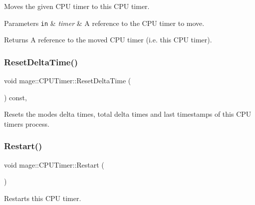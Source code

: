 Moves the given C\+PU timer to this C\+PU timer.


\begin{DoxyParams}[1]{Parameters}
\mbox{\tt in}  & {\em timer} & A reference to the C\+PU timer to move. \\
\hline
\end{DoxyParams}
\begin{DoxyReturn}{Returns}
A reference to the moved C\+PU timer (i.\+e. this C\+PU timer). 
\end{DoxyReturn}
\hypertarget{classmage_1_1_c_p_u_timer_acb1a264ae09cea3d96794e3c0af246e7}{}\label{classmage_1_1_c_p_u_timer_acb1a264ae09cea3d96794e3c0af246e7} 
\subsubsection{\texorpdfstring{Reset\+Delta\+Time()}{ResetDeltaTime()}}
{\footnotesize\ttfamily void mage\+::\+C\+P\+U\+Timer\+::\+Reset\+Delta\+Time (\begin{DoxyParamCaption}{ }\end{DoxyParamCaption}) const\hspace{0.3cm}{\ttfamily [private]}, {\ttfamily [noexcept]}}

Resets the modes\textquotesingle{} delta times, total delta times and last timestamps of this C\+PU timer\textquotesingle{}s process. \hypertarget{classmage_1_1_c_p_u_timer_aad56acfa4f2990d6894d75721ba16f15}{}\label{classmage_1_1_c_p_u_timer_aad56acfa4f2990d6894d75721ba16f15} 
\subsubsection{\texorpdfstring{Restart()}{Restart()}}
{\footnotesize\ttfamily void mage\+::\+C\+P\+U\+Timer\+::\+Restart (\begin{DoxyParamCaption}{ }\end{DoxyParamCaption})\hspace{0.3cm}{\ttfamily [noexcept]}}

Restarts this C\+PU timer. \hypertarget{classmage_1_1_c_p_u_timer_a8285a7306896f52adb093284d6c9da4d}{}\label{classmage_1_1_c_p_u_timer_a8285a7306896f52adb093284d6c9da4d} 
